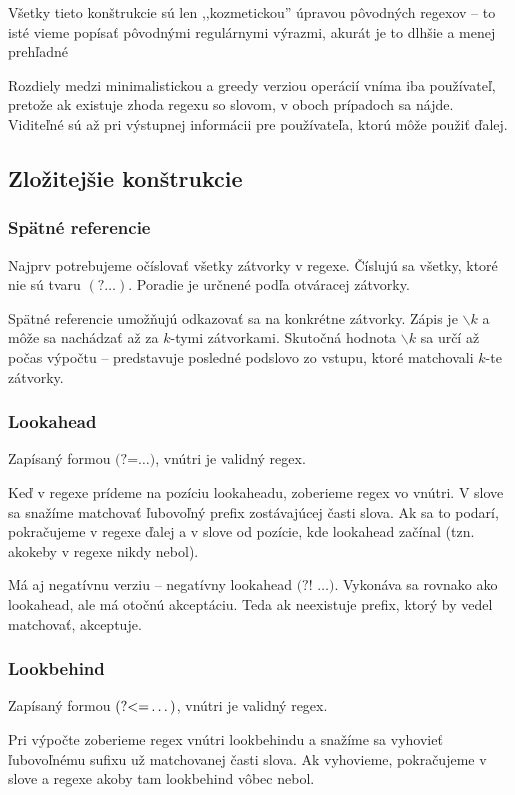 \documentclass{svk_long_sk}
\def\lookahead{\text{(?=}}
\def\nlookahead{\text{(?!~}}
\def\lookbehind{\text{(?\textless =}}
\begin{document}
Všetky tieto konštrukcie sú len ,,kozmetickou'' úpravou pôvodných regexov -- to isté vieme popísať pôvodnými regulárnymi výrazmi, akurát je to dlhšie a menej prehľadné

Rozdiely medzi minimalistickou a greedy verziou operácií vníma iba používateľ, pretože ak existuje zhoda regexu so slovom, v oboch prípadoch sa nájde. Viditeľné sú až pri výstupnej informácii pre používateľa, ktorú môže použiť ďalej.

\subsection{Zložitejšie konštrukcie}
\subsubsection*{Spätné referencie}
Najprv potrebujeme očíslovať všetky zátvorky v regexe. Číslujú sa všetky, ktoré nie sú tvaru $(?\dots)$. Poradie je určnené podľa otváracej zátvorky.

Spätné referencie umožňujú odkazovať sa na konkrétne zátvorky. Zápis je $\backslash k$ a môže sa nachádzať až za $k$-tymi zátvorkami. Skutočná hodnota $\backslash k$ sa určí až počas výpočtu -- predstavuje posledné podslovo zo vstupu, ktoré matchovali $k$-te zátvorky.

\subsubsection*{Lookahead}
Zapísaný formou $\lookahead \dots)$, vnútri je validný regex.

Keď v regexe prídeme na pozíciu lookaheadu, zoberieme regex vo vnútri. V slove sa snažíme matchovať ľubovoľný prefix zostávajúcej časti slova. Ak sa to podarí, pokračujeme v regexe ďalej a v slove od pozície, kde lookahead začínal (tzn. akokeby v regexe nikdy nebol).

Má aj negatívnu verziu -- negatívny lookahead $\nlookahead \dots)$. Vykonáva sa rovnako ako lookahead, ale má otočnú akceptáciu. Teda ak neexistuje prefix, ktorý by vedel matchovať, akceptuje.

\subsubsection*{Lookbehind}
Zapísaný formou $\lookbehind \dots)$, vnútri je validný regex.

Pri výpočte zoberieme regex vnútri lookbehindu a snažíme sa vyhovieť ľubovoľnému sufixu už matchovanej časti slova. Ak vyhovieme, pokračujeme v slove a regexe akoby tam lookbehind vôbec nebol.
\end{document}
